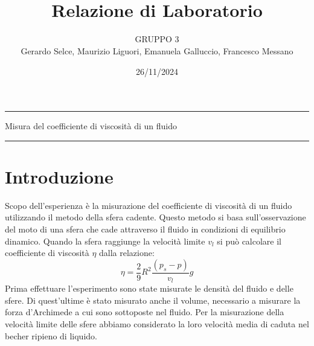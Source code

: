 \documentclass[11pt]{article}
\begin{document}
\setlength{\parindent}{0pt}
\title{\vspace{-4em}{\large Laboratorio di Meccanica e Termodinamica} \\
    Relazione di Laboratorio}
\author{GRUPPO 3 \\ 
Gerardo Selce, Maurizio Liguori, Emanuela Galluccio, Francesco Messano}
\date{26/11/2024}
\maketitle

\vspace{-2em}\par\noindent\rule{\textwidth}{0.4pt}
\begin{center}
    {\Large\sc Misura del coefficiente di viscosità di un fluido}
\end{center}
\par\noindent\rule{\textwidth}{0.4pt}
\section{Introduzione}
Scopo dell'esperienza è la misurazione del coefficiente di viscosità di un fluido utilizzando il metodo della sfera cadente. Questo metodo si basa sull'osservazione del moto di una sfera che cade attraverso il fluido in condizioni di equilibrio dinamico. Quando la sfera raggiunge la velocità limite $v_l$ si può calcolare il coefficiente di viscosità $\eta$ dalla relazione:
\begin{equation}
    \eta=\frac{2}{9}R^2\frac{(p_s-p)}{v_l}g
\end{equation}
Prima effettuare l'esperimento sono state misurate le densità del fluido e delle sfere. Di quest'ultime è stato misurato anche il volume, necessario a misurare la forza d'Archimede a cui sono sottoposte nel fluido. Per la misurazione della velocità limite delle sfere abbiamo considerato la loro velocità media di caduta nel becher ripieno di liquido.
\end{document}

